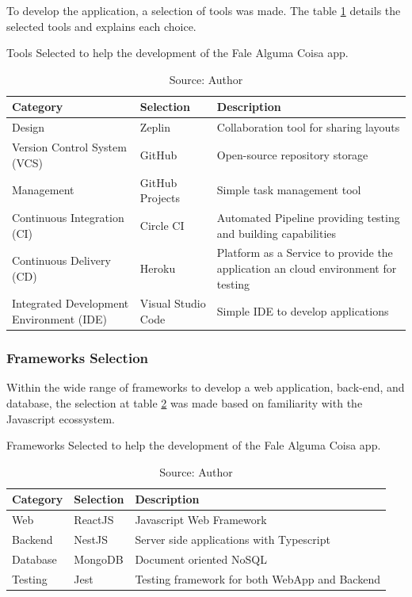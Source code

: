 To develop the application, a selection of tools was made. The table \ref{tab:tools-selection} details the selected tools and explains each choice.

\begin{table}[h]
    \centering
    \caption{Tools Selected to help the development of the Fale Alguma Coisa app.}
    \label{tab:tools-selection}
    \begin{tabular}{|p{5cm}|p{2.5cm}|p{7cm}|}
        \hline Category & Selection & Description \\
        \hline Design & Zeplin & Collaboration tool for sharing layouts \\ 
        \hline Version Control System (VCS) & GitHub & Open-source repository storage \\
        \hline Management & GitHub Projects & Simple task management tool \\
        \hline Continuous Integration (CI) & Circle CI & Automated Pipeline providing testing and building capabilities \\ 
        \hline Continuous Delivery (CD) & Heroku & Platform as a Service to provide the application an cloud environment for testing \\ 
        \hline Integrated Development Environment (IDE) & Visual Studio Code & Simple IDE to develop applications \\ \hline 
    \end{tabular}
    \caption*{Source: Author}
\end{table}

\subsubsection{Frameworks Selection}

Within the wide range of frameworks to develop a web application, back-end, and database, the selection at table \ref{tab:frameworks-selection} was made based on familiarity with the Javascript ecossystem.

\begin{table}[h]
    \centering
    \caption{Frameworks Selected to help the development of the Fale Alguma Coisa app.}
    \label{tab:frameworks-selection}
    \begin{tabular}{|p{5cm}|p{2.5cm}|p{7cm}|}
        \hline Category & Selection & Description \\
        \hline Web & ReactJS & Javascript Web Framework \\ 
        \hline Backend & NestJS & Server side applications with Typescript \\ 
        \hline Database & MongoDB & Document oriented NoSQL \\ 
        \hline Testing & Jest & Testing framework for both WebApp and Backend \\ \hline 
    \end{tabular}
    \caption*{Source: Author}
\end{table}



